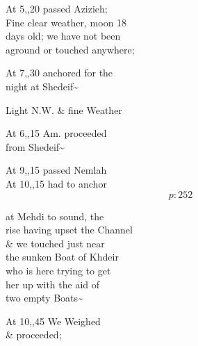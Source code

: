 \documentclass{report}
\begin{document}
	\par{
 	At 5,,20 passed Azizieh;\ \\Fine clear weather, moon 18\ \\days old; we have not been\ \\aground or touched anywhere;\ \\
	}

	\par{
 	At 7,,30 anchored for the\ \\night at Shedeif\~{}\ \\
	}

	\par{
 	Light N.W. \& fine Weather\ \\
	}

	\par{
 	At 6,,15 Am. proceeded\ \\from Shedeif\~{}\ \\
	}

	\par{
 	At 9,,15 passed Nemlah\ \\At 10,,15 had to anchor\ \\
  \[p: 252 \]

	}


	\par{
 	at Mehdi to sound, the\ \\rise having upset the Channel\ \\\& we touched just near\ \\the sunken Boat of Khdeir\ \\who is here trying to get\ \\her up with the aid of\ \\two empty Boats\~{}\ \\
	}

	\par{
 	At 10,,45 We Weighed\ \\\& proceeded;\ \\
	}
\end{document}
